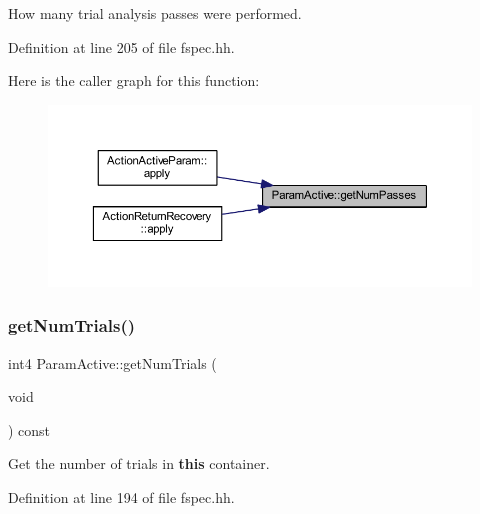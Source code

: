 How many trial analysis passes were performed. 



Definition at line 205 of file fspec.\+hh.

Here is the caller graph for this function\+:
\nopagebreak
\begin{figure}[H]
\begin{center}
\leavevmode
\includegraphics[width=350pt]{class_param_active_af2221b328688426d4a192c0704ed787e_icgraph}
\end{center}
\end{figure}
\mbox{\label{class_param_active_aef5c24a78fbfe7a847eceec2c8854fbb}} 
\subsubsection{\texorpdfstring{getNumTrials()}{getNumTrials()}}
{\footnotesize\ttfamily int4 Param\+Active\+::get\+Num\+Trials (\begin{DoxyParamCaption}\item[{void}]{ }\end{DoxyParamCaption}) const\hspace{0.3cm}{\ttfamily [inline]}}



Get the number of trials in {\bfseries{this}} container. 



Definition at line 194 of file fspec.\+hh.

